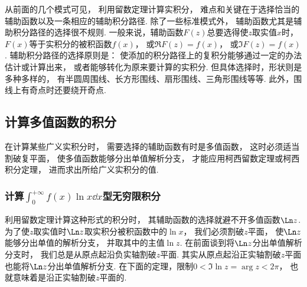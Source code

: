 从前面的几个模式可见，
利用留数定理计算实积分，
难点和关键在于选择恰当的辅助函数以及一条相应的辅助积分路径.
除了一些标准模式外，
辅助函数尤其是辅助积分路径的选择很不规则.
一般来说，辅助函数\(F(z)\)总要选得使\(z\)取实值\(x\)时，
\(F(x)\)等于实积分的被积函数\(f(x)\)，
或\(\Re{F(z)} = f(x)\)，
或\(\Im{F(z)} = f(x)\).
辅助积分路径的选择原则是：
使添加的积分路径上的复积分能够通过一定的办法估计或计算出来，
或者能够转化为原来要计算的实积分.
但具体选择时，形状则是多种多样的，
有半圆周围线、长方形围线、扇形围线、三角形围线等等.
此外，围线上有奇点时还要绕开奇点.

\subsection{计算多值函数的积分}
在计算某些广义实积分时，
需要选择的辅助函数有时是多值函数，
这时必须适当割破复平面，
使多值函数能够分出单值解析分支，
才能应用柯西留数定理或柯西积分定理，
进而求出所给广义实积分的值.

\subsubsection{计算\texorpdfstring{\(\int_0^{+\infty} f(x) \ln x \dd{x}\)型}{含有对数函数的}无穷限积分}
利用留数定理计算这种形式的积分时，
其辅助函数的选择就避不开多值函数\(\Ln z\).
为了使\(z\)取实值时\(\Ln z\)取实积分被积函数中的\(\ln x\)，
我们必须割破\(z\)平面，
使\(\Ln z\)能够分出单值的解析分支，
并取其中的主值\(\ln z\).
在前面谈到将\(\Ln z\)分出单值解析分支时，
我们总是从原点起沿负实轴割破\(z\)平面.
其实从原点起沿正实轴割破\(z\)平面也能将\(\Ln z\)分出单值解析分支.
在下面的定理，限制\(0 < \Im \ln z = \arg z < 2\pi\)，
也就意味着是沿正实轴割破\(z\)平面的.

